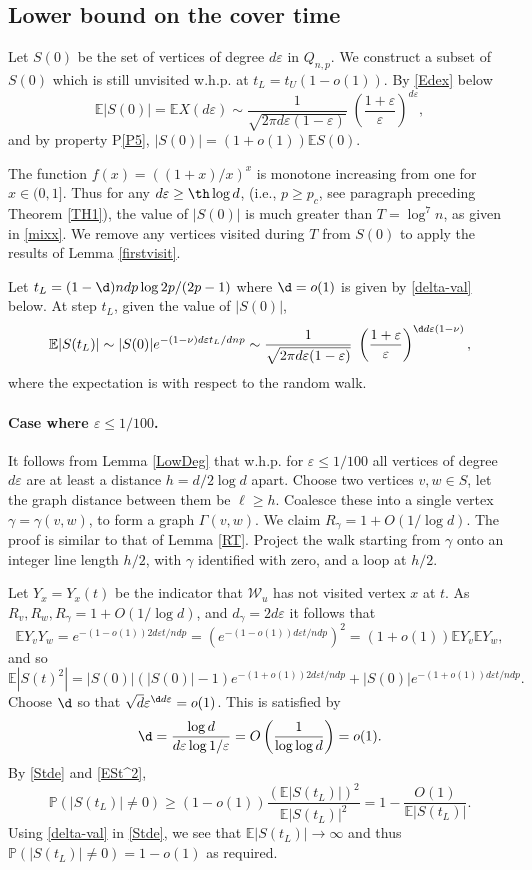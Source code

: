 \documentclass[12pt]{article}
\def\e{\varepsilon} \def\f{\phi} \def\F{{\Phi}} \def\vp{\varphi} \def\g{\gamma}
\def\G{\Gamma} \def\i{\iota} \def\k{\kappa}\def\K{\Kappa}
\newcommand{\ooi}{(1+o(1))}
\newcommand{\brac}[1]{\left(#1\right)}
\newcommand{\bfrac}[2]{\left(\frac{#1}{#2}\right)}
\newcommand{\rai}{\rightarrow \infty}
\def\E{\mathbb{E}}
\def\Pr{\mathbb{P}}
\def\cW{{\mathcal W}}
\newcommand{\beq}[2]{\begin{equation}\label{#1}#2\end{equation}}
\begin{document}
\subsection{Lower bound on the cover time}\label{seclob}

Let $S(0)$ be the set of vertices of degree $d\e$ in $Q_{n,p}$. We construct a subset of $S(0)$ which is still unvisited w.h.p. at $t_L= t_U(1-o(1))$.
By \eqref{Edex} below
 \beq{ES0}{
\E |S(0)|=\E X(d\e) \sim
\frac{1}{\sqrt{2\pi d\e(1-\e)}} \; \bfrac{1+\e}{\e}^{d \e },
}
and by property P\ref{P5}, $|S(0)| =\ooi \E S(0)$.

The function $f(x)=((1+x)/x)^x$ is monotone increasing from one for $x \in (0,1]$.   Thus for any $d\e \ge \th \log d$, (i.e., $p \ge p_c$, see paragraph preceding Theorem \ref{TH1}), the value of $|S(0)|$ is much greater than $T=\log^7 n$, as given in \eqref{mixx}. We remove any vertices visited during $T$ from $S(0)$ to apply the results of Lemma \ref{firstvisit}.

Let $t_L=(1-\d)ndp \log 2p/(2p-1)$ where $\d=o(1)$ is given by \eqref{delta-val} below. At step $t_L$, given the value of $|S(0)|$,
\begin{equation}\label{Stde}
\E |S(t_L)| \sim  |S(0)| e^{-(1-\nu) d \e t_L/dnp}\sim \frac{1}{\sqrt{2\pi d\e(1-\e)}} \; \bfrac{1+\e}{\e}^{\d d\e (1-\nu)},
\end{equation}
where the expectation is with respect to the random walk.

\paragraph{Case where  $\e \le 1/100$.}
It follows from Lemma \ref{LowDeg} that w.h.p. for $\e \le 1/100$ all vertices of degree $d\e$ are at least a distance $h=d/2\log d$ apart. Choose two vertices $v,w \in S$, let the graph distance between them be $\ell \ge h$. Coalesce these into a single vertex $\g=\g(v,w)$, to form a graph $\G(v,w)$. We claim $R_\g=1+O(1/\log d)$. The proof is similar to that of Lemma \ref{RT}. Project the walk starting from $\g$ onto an integer line length $h/2$, with $\g$ identified with zero, and a loop at $h/2$.


Let $Y_x=Y_x(t)$ be the indicator that $\cW_u$ has not visited vertex $x$ at $t$. As $R_v, R_w, R_\g=1+O(1/\log d)$, and $d_\g=2d\e$ it follows that
\[
\E Y_vY_w=e^{-(1-o(1)) 2d\e t/ndp}=\brac{ e^{-(1-o(1)) d\e t/ndp}}^2 =\ooi \E Y_v \E Y_w,
\]
and so
\begin{equation}\label{ESt^2}
\E |S(t)^2|=|S(0)|(|S(0)|-1)e^{-(1+o(1))2d\e t/ndp}+|S(0)|e^{-(1+o(1))d\e t/ndp}.
\end{equation}
Choose $\d$ so that $\sqrt d \e^{\d d\e} =o(1)$.
This is satisfied by
\begin{equation}\label{delta-val}
\d= \frac{\log d}{d\e \log 1/\e}= O\bfrac{1}{\log \log d}=o(1).
\end{equation}
By \eqref{Stde} and \eqref{ESt^2},
\[
\Pr(|S(t_L)| \ne 0) \ge (1-o(1)) \frac{(\E |S(t_L)|)^2}{\E |S(t_L)|^2}= 1-\frac {O(1)}{\E |S(t_L)|}.
\]
Using \eqref{delta-val} in  \eqref{Stde}, we see that $\E |S(t_L)| \rai$ and thus $\Pr(|S(t_L)| \ne 0)=1-o(1)$ as required.
\end{document}
